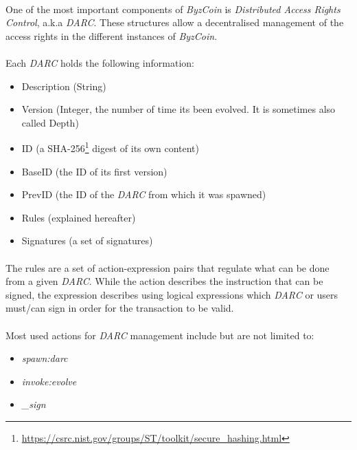 \paragraph{}

One of the most important components of \textit{ByzCoin} is \textit{Distributed Access Rights Control}, a.k.a \textit{DARC}. These structures allow a decentralised management of the access rights in the different instances of \textit{ByzCoin}.

\paragraph{}

Each \textit{DARC} holds the following information:
\begin{itemize}
    \item Description (String)
    \item Version (Integer, the number of time its been evolved. It is sometimes also called Depth)
    \item ID (a SHA-256\footnote{\url{https://csrc.nist.gov/groups/ST/toolkit/secure_hashing.html}} digest of its own content)
    \item BaseID (the ID of its first version)
    \item PrevID (the ID of the \textit{DARC} from which it was spawned)
    \item Rules (explained hereafter)
    \item Signatures (a set of signatures)
\end{itemize}

\paragraph{}

The rules are a set of action-expression pairs that regulate what can be done from a given \textit{DARC}. While the action describes the instruction that can be signed, the expression describes using logical expressions which \textit{DARC} or users must/can sign in order for the transaction to be valid.

\paragraph{}

Most used actions for \textit{DARC} management include but are not limited to:
\begin{itemize}
    \item \textit{spawn:darc}
    \item \textit{invoke:evolve}
    \item \textit{\_sign}
\end{itemize}

